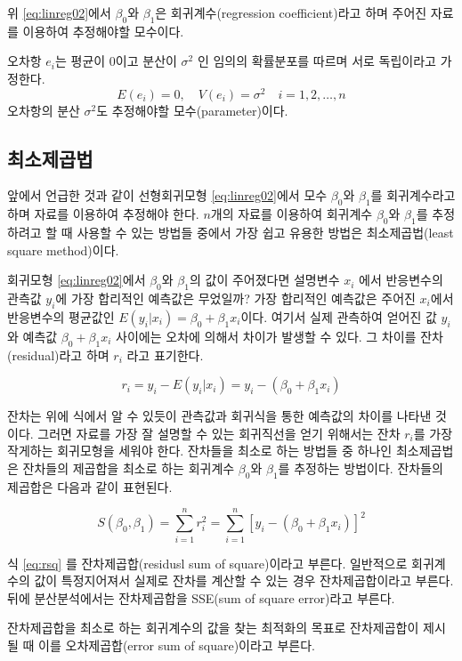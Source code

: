 \documentclass[
  10pt,
]{book}
\makeatletter
\newenvironment{kframe}{%
\medskip{}
\setlength{\fboxsep}{.8em}
 \def\at@end@of@kframe{}%
 \ifinner\ifhmode%
  \def\at@end@of@kframe{\end{minipage}}%
  \begin{minipage}{\columnwidth}%
 \fi\fi%
 \def\FrameCommand##1{\hskip\@totalleftmargin \hskip-\fboxsep
 \colorbox{shadecolor}{##1}\hskip-\fboxsep
     \hskip-\linewidth \hskip-\@totalleftmargin \hskip\columnwidth}%
 \MakeFramed {\advance\hsize-\width
   \@totalleftmargin\z@ \linewidth\hsize
   \@setminipage}}%
 {\par\unskip\endMakeFramed%
 \at@end@of@kframe}
\newenvironment{rmdblock}[1]
  {
  \begin{itemize}
  \renewcommand{\labelitemi}{
    \raisebox{-.7\height}[0pt][0pt]{
      {\setkeys{Gin}{width=3em,keepaspectratio}\texttt{[image: images/\#1]}}
    }
  }
  \setlength{\fboxsep}{1em}
  \begin{kframe}
  \item
  }
  {
  \end{kframe}
  \end{itemize}
  }
\newenvironment{rmdnote}
  {\begin{rmdblock}{note}}
  {\end{rmdblock}}
\theoremstyle{definition}
\theoremstyle{definition}
\theoremstyle{definition}
\theoremstyle{definition}
\theoremstyle{remark}
\makeatother
\begin{document}
위 \eqref{eq:linreg02}에서 \(\beta_0\)와 \(\beta_1\)은 회귀계수(regression
coefficient)라고 하며 주어진 자료를 이용하여 추정해야할 모수이다.

오차항 \(e_i\)는 평균이 \(0\)이고 분산이 \(\sigma^2\) 인 임의의 확률분포를
따르며 서로 독립이라고 가정한다.\\
\[ E(e_i)=0, \quad V(e_i) = \sigma^2 \quad i=1,2,\dots,n \] 오차항의
분산 \(\sigma^2\)도 추정해야할 모수(parameter)이다.

\hypertarget{uxcd5cuxc18cuxc81cuxacf1uxbc95}{%
\subsection{최소제곱법}\label{uxcd5cuxc18cuxc81cuxacf1uxbc95}}

앞에서 언급한 것과 같이 선형회귀모형 \eqref{eq:linreg02}에서 모수
\(\beta_0\)와 \(\beta_1\)를 회귀계수라고 하며 자료를 이용하여 추정해야 한다.
\(n\)개의 자료를 이용하여 회귀계수 \(\beta_0\)와 \(\beta_1\)를 추정하려고 할
때 사용할 수 있는 방법들 중에서 가장 쉽고 유용한 방법은 최소제곱법(least
square method)이다.

회귀모형 \eqref{eq:linreg02}에서 \(\beta_0\)와 \(\beta_1\)의 값이 주어졌다면
설명변수 \(x_i\) 에서 반응변수의 관측값 \(y_i\)에 가장 합리적인 예측값은
무었일까? 가장 합리적인 예측값은 주어진 \(x_i\)에서 반응변수의 평균값인
\(E(y_i | x_i)=\beta_0 + \beta_1 x_i\)이다. 여기서 실제 관측하여 얻어진 값
\(y_i\)와 예측값 \(\beta_0 + \beta_1 x_i\) 사이에는 오차에 의해서 차이가
발생할 수 있다. 그 차이를 잔차(residual)라고 하며 \(r_i\) 라고 표기한다.

\[  r_i = y_i - E(y_i|x_i) = y_i - (  \beta_0 +  \beta_1 x_i) \]

잔차는 위에 식에서 알 수 있듯이 관측값과 회귀식을 통한 예측값의 차이를
나타낸 것이다. 그러면 자료를 가장 잘 설명할 수 있는 회귀직선을 얻기
위해서는 잔차 \(r_i\)를 가장 작게하는 회귀모형을 세워야 한다. 잔차들을
최소로 하는 방법들 중 하나인 최소제곱법은 잔차들의 제곱합을 최소로 하는
회귀계수 \(\beta_0\)와 \(\beta_1\)를 추정하는 방법이다. 잔차들의 제곱합은
다음과 같이 표현된다.

\begin{equation} 
 S(\beta_0 , \beta_1) = \sum^n_{i=1}r^2_i = \sum^n_{i=1}[y_i-(\beta_0 + \beta_1 x_i)]^2 
 \label{eq:rsq}
 \end{equation}

\begin{rmdnote}
식 \eqref{eq:rsq} 를 잔차제곱합(residusl sum of square)이라고 부른다. 일반적으로 회귀계수의 값이 특정지어져서 실제로 잔차를 계산할 수 있는 경우 잔차제곱합이라고 부른다. 뒤에 분산분석에서는 잔차제곱합을 SSE(sum of square error)라고 부른다.

잔차제곱합을 최소로 하는 회귀계수의 값을 찾는 최적화의 목표로 잔차제곱합이 제시될 때 이를 오차제곱합(error sum of square)이라고 부른다.
\end{rmdnote}
\end{document}
